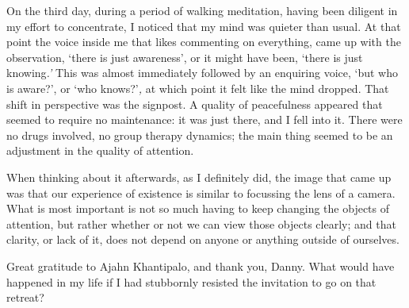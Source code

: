 On the third day, during a period of walking meditation, having been
diligent in my effort to concentrate, I noticed that my mind was quieter
than usual. At that point the voice inside me that likes commenting on
everything, came up with the observation, `there is just awareness', or
it might have been, `there is just knowing\emph{.'} This was almost
immediately followed by an enquiring voice, `but who is aware?', or `who
knows?'\emph{,} at which point it felt like the mind dropped. That shift
in perspective was the signpost. A quality of peacefulness appeared that
seemed to require no maintenance: it was just there, and I fell into it.
There were no drugs involved, no group therapy dynamics; the main thing
seemed to be an adjustment in the quality of attention.

When thinking about it afterwards, as I definitely did, the image that
came up was that our experience of existence is similar to focussing the
lens of a camera. What is most important is not so much having to keep
changing the objects of attention, but rather whether or not we can view
those objects clearly; and that clarity, or lack of it, does not depend
on anyone or anything outside of ourselves.

Great gratitude to Ajahn Khantipalo, and thank you, Danny. What would
have happened in my life if I had stubbornly resisted the invitation to
go on that retreat?

